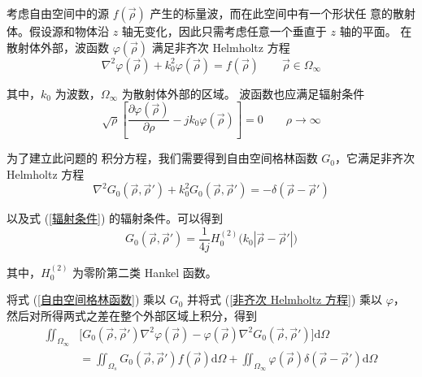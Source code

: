 \par 考虑自由空间中的源 $f(\vec{\rho})$ 产生的标量波，而在此空间中有一个形状任
意的散射体。假设源和物体沿 $z$ 轴无变化，因此只需考虑任意一个垂直于 $z$ 轴的平面。
在散射体外部，波函数 $\varphi(\vec{\rho})$ 满足非齐次 Helmholtz 方程
\begin{equation}
    \nabla^2 \varphi(\vec{\rho}) + k_0^2 \varphi(\vec{\rho}) = f(\vec{\rho})
    \qquad
    \vec{\rho} \in \Omega_{\infty}
    \label{非齐次 Helmholtz 方程}
\end{equation}
\par 其中，$k_0$ 为波数，$\Omega_{\infty}$ 为散射体外部的区域。
波函数也应满足辐射条件
\begin{equation}
    \sqrt{\rho} \left[
        \frac{\partial \varphi(\vec{\rho})}{\partial \rho}
        -j k_0 \varphi(\vec{\rho})
    \right] = 0
    \qquad
    \rho \rightarrow \infty
    \label{辐射条件}
\end{equation}
\par 为了建立此问题的
积分方程，我们需要得到自由空间格林函数 $G_0$，它满足非齐次 Helmholtz 方程
\begin{equation}
    \nabla^2 G_0(\vec{\rho}, \vec{\rho}') + k_0^2 G_0(\vec{\rho}, \vec{\rho}') 
    = -\delta(\vec{\rho}-\vec{\rho}')
    \label{自由空间格林函数}
\end{equation}
\par 以及式 (\ref{辐射条件}) 的辐射条件。可以得到
\begin{equation}
    G_0(\vec{\rho}, \vec{\rho}') = 
    \frac{1}{4j}H_0^{(2)}
    \Big(
        k_0 \left|\vec{\rho}-\vec{\rho}'\right|
    \Big)
\end{equation}
\par 其中，$H_0^{(2)}$ 为零阶第二类 Hankel 函数。
\par 将式 (\ref{自由空间格林函数}) 乘以 $G_0$
并将式 (\ref{非齐次 Helmholtz 方程}) 乘以 $\varphi$，
然后对所得两式之差在整个外部区域上积分，得到
\begin{equation}
    \begin{aligned}
        \iint_{\Omega_{\infty}}&\Big[
            G_0(\vec{\rho}, \vec{\rho}') \nabla^2 \varphi(\vec{\rho})
            -\varphi(\vec{\rho}) \nabla^2 G_0(\vec{\rho}, \vec{\rho}')
        \Big]\text{d}\Omega\\
        &=\iint_{\Omega_{s}}
        G_0(\vec{\rho}, \vec{\rho}') f(\vec{\rho}) \text{d}\Omega
        +\iint_{\Omega_{\infty}}
        \varphi(\vec{\rho}) \delta(\vec{\rho}-\vec{\rho}') \text{d}\Omega
    \end{aligned}
\end{equation}
